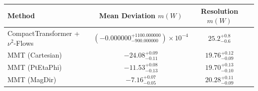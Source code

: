     \begin{tabular}{lccc}
        \toprule
        Method & Mean Deviation $m(W)$ & Resolution $m(W)$ \\
        \midrule
        CompactTransformer + $\nu^2$-Flows & $(-0.000000^{+1100.000000}_{-900.000000})\times 10^{-4}$ & $25.2^{+0.8}_{-0.6}$ \\
        MMT (Cartesian) & $-24.08^{+0.09}_{-0.11}$ & $19.76^{+0.12}_{-0.09}$ \\
        MMT (PtEtaPhi) & $-11.53^{+0.08}_{-0.13}$ & $19.70^{+0.13}_{-0.10}$ \\
        MMT (MagDir) & $-7.16^{+0.07}_{-0.05}$ & $20.28^{+0.11}_{-0.09}$ \\
        \bottomrule
    \end{tabular}